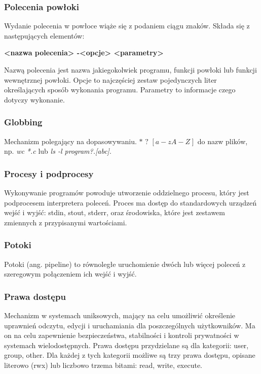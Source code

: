 \documentclass[a4paper,twoside]{report}
\begin{document}
\subsubsection{Polecenia powłoki}
Wydanie polecenia w powłoce wiąże się z podaniem ciągu znaków. Składa się z następujących elementów:
\begin{center}\textbf{<nazwa polecenia> -<opcje> <parametry>}\end{center}
Nazwą polecenia jest nazwa jakiegokolwiek programu, funkcji powłoki lub funkcji   wewnętrznej powłoki. Opcje to najczęściej zestaw pojedynczych liter określających     sposób wykonania programu. Parametry to informacje czego dotyczy wykonanie.

\subsubsection{Globbing}
Mechanizm polegający na dopasowywaniu.
$*$ $?$ $[a-z A-Z_{}]$ do nazw plików, np. \emph{wc *.c} lub \emph{ls -l program?.[abc]}.

\subsubsection{Procesy i podprocesy}
Wykonywanie programów powoduje utworzenie oddzielnego procesu, który jest podprocesem interpretera poleceń. Proces ma dostęp do standardowych urządzeń wejść i wyjść: stdin, stout, stderr, oraz środowiska, które jest zestawem zmiennych z przypisanymi wartościami.

\subsubsection{Potoki}
Potoki (ang. pipeline) to równoległe uruchomienie dwóch lub więcej poleceń z szeregowym połączeniem ich wejść i wyjść.

\subsubsection{Prawa dostępu}

Mechanizm w systemach uniksowych, mający na celu umożliwić określenie uprawnień odczytu, edycji i uruchamiania dla poszczególnych użytkowników. Ma on na celu zapewnienie bezpieczeństwa, stabilności i kontroli prywatności w systemach wielodostępnych.
Prawa dostępu przydzielane są dla kategorii: user,    group,  other.
Dla każdej z tych kategorii możliwe są trzy prawa dostępu, opisane literowo (rwx) lub liczbowo trzema bitami: read, write, execute. 
\end{document}
